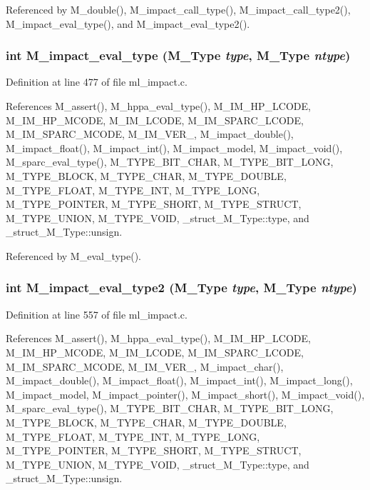 Referenced by M\_\-double(), M\_\-impact\_\-call\_\-type(), M\_\-impact\_\-call\_\-type2(), M\_\-impact\_\-eval\_\-type(), and M\_\-impact\_\-eval\_\-type2().
\subsubsection{\setlength{\rightskip}{0pt plus 5cm}int M\_\-impact\_\-eval\_\-type (\bf{M\_\-Type} {\em type}, \bf{M\_\-Type} {\em ntype})}\label{m__impact_8h_a1a04fd589ebbb42a94d90e64e0eb165}




Definition at line 477 of file ml\_\-impact.c.

References M\_\-assert(), M\_\-hppa\_\-eval\_\-type(), M\_\-IM\_\-HP\_\-LCODE, M\_\-IM\_\-HP\_\-MCODE, M\_\-IM\_\-LCODE, M\_\-IM\_\-SPARC\_\-LCODE, M\_\-IM\_\-SPARC\_\-MCODE, M\_\-IM\_\-VER\_, M\_\-impact\_\-double(), M\_\-impact\_\-float(), M\_\-impact\_\-int(), M\_\-impact\_\-model, M\_\-impact\_\-void(), M\_\-sparc\_\-eval\_\-type(), M\_\-TYPE\_\-BIT\_\-CHAR, M\_\-TYPE\_\-BIT\_\-LONG, M\_\-TYPE\_\-BLOCK, M\_\-TYPE\_\-CHAR, M\_\-TYPE\_\-DOUBLE, M\_\-TYPE\_\-FLOAT, M\_\-TYPE\_\-INT, M\_\-TYPE\_\-LONG, M\_\-TYPE\_\-POINTER, M\_\-TYPE\_\-SHORT, M\_\-TYPE\_\-STRUCT, M\_\-TYPE\_\-UNION, M\_\-TYPE\_\-VOID, \_\-struct\_\-M\_\-Type::type, and \_\-struct\_\-M\_\-Type::unsign.

Referenced by M\_\-eval\_\-type().
\subsubsection{\setlength{\rightskip}{0pt plus 5cm}int M\_\-impact\_\-eval\_\-type2 (\bf{M\_\-Type} {\em type}, \bf{M\_\-Type} {\em ntype})}\label{m__impact_8h_a005d77e1253669ccb2887ecee53ec79}




Definition at line 557 of file ml\_\-impact.c.

References M\_\-assert(), M\_\-hppa\_\-eval\_\-type(), M\_\-IM\_\-HP\_\-LCODE, M\_\-IM\_\-HP\_\-MCODE, M\_\-IM\_\-LCODE, M\_\-IM\_\-SPARC\_\-LCODE, M\_\-IM\_\-SPARC\_\-MCODE, M\_\-IM\_\-VER\_, M\_\-impact\_\-char(), M\_\-impact\_\-double(), M\_\-impact\_\-float(), M\_\-impact\_\-int(), M\_\-impact\_\-long(), M\_\-impact\_\-model, M\_\-impact\_\-pointer(), M\_\-impact\_\-short(), M\_\-impact\_\-void(), M\_\-sparc\_\-eval\_\-type(), M\_\-TYPE\_\-BIT\_\-CHAR, M\_\-TYPE\_\-BIT\_\-LONG, M\_\-TYPE\_\-BLOCK, M\_\-TYPE\_\-CHAR, M\_\-TYPE\_\-DOUBLE, M\_\-TYPE\_\-FLOAT, M\_\-TYPE\_\-INT, M\_\-TYPE\_\-LONG, M\_\-TYPE\_\-POINTER, M\_\-TYPE\_\-SHORT, M\_\-TYPE\_\-STRUCT, M\_\-TYPE\_\-UNION, M\_\-TYPE\_\-VOID, \_\-struct\_\-M\_\-Type::type, and \_\-struct\_\-M\_\-Type::unsign.

